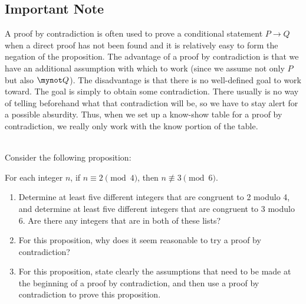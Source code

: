 \subsection*{Important Note}
A proof by contradiction is often used to prove a conditional statement \linebreak
$P \to Q$  when a direct proof has not been found and it is relatively easy to form the negation of the proposition.  The advantage of a proof by contradiction is that we have an additional assumption with which to work (since we assume not only  $P$ but also  $\mynot  Q$).  The disadvantage is that there is no well-defined goal to work toward.  The goal is simply to obtain some contradiction.  There usually is no way of telling beforehand what that contradiction will be, so we have to stay alert for a possible absurdity.  Thus, when we set up a know-show table for a proof by contradiction, we really only work with the know portion of the table.  %
\hbreak

\begin{prog}\label{pr:exploreproof} \hfill \\
Consider the following proposition:
\begin{list}{}
  \item For each integer $n$, if  $n \equiv 2 \pmod 4$, then  
$n\not  \equiv 3 \pmod 6$.
\end{list}
\begin{enumerate}
  \item Determine at least five different integers that are congruent to  2  modulo  4, 
\label{pr:exploreproof1}%
 and determine at least five different integers that are congruent to  3  modulo  6.  Are there any integers that are in both of these lists?

  \item For this proposition, why does it seem reasonable to try a proof by contradiction?

  \item For this proposition, state clearly the assumptions that need to be made at the beginning of a proof by contradiction, and then use a proof by contradiction to prove this proposition.
\end{enumerate}
\end{prog}
\hbreak

\endinput
